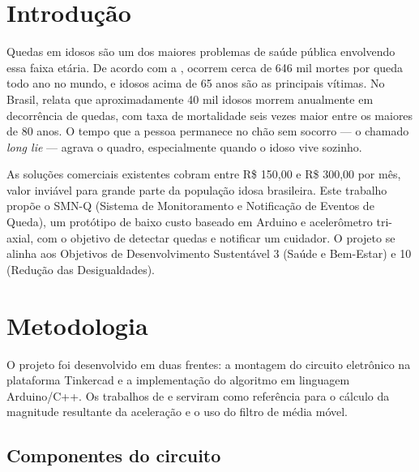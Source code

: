 
\section{\esp Introdução}

Quedas em idosos são um dos maiores problemas de saúde pública envolvendo essa faixa etária. De acordo com a , ocorrem cerca de 646 mil mortes por queda todo ano no mundo, e idosos acima de 65 anos são as principais vítimas. No Brasil,  relata que aproximadamente 40 mil idosos morrem anualmente em decorrência de quedas, com taxa de mortalidade seis vezes maior entre os maiores de 80 anos. O tempo que a pessoa permanece no chão sem socorro --- o chamado \textit{long lie} --- agrava o quadro, especialmente quando o idoso vive sozinho.

As soluções comerciais existentes cobram entre R\$ 150,00 e R\$ 300,00 por mês, valor inviável para grande parte da população idosa brasileira. Este trabalho propõe o SMN-Q (Sistema de Monitoramento e Notificação de Eventos de Queda), um protótipo de baixo custo baseado em Arduino e acelerômetro tri-axial, com o objetivo de detectar quedas e notificar um cuidador. O projeto se alinha aos Objetivos de Desenvolvimento Sustentável 3 (Saúde e Bem-Estar) e 10 (Redução das Desigualdades).

\section{\esp Metodologia}

O projeto foi desenvolvido em duas frentes: a montagem do circuito eletrônico na plataforma Tinkercad e a implementação do algoritmo em linguagem Arduino/C++. Os trabalhos de  e  serviram como referência para o cálculo da magnitude resultante da aceleração e o uso do filtro de média móvel.

\subsection{\esp Componentes do circuito}

